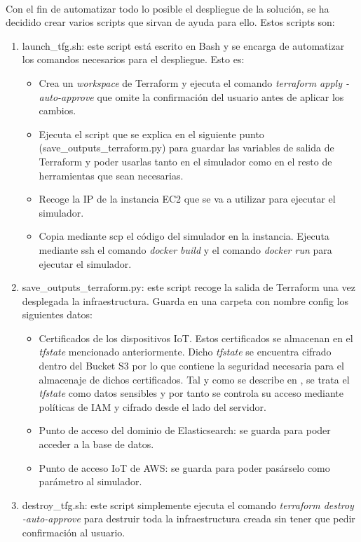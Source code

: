 \documentclass[../../memoria.tex]{subfiles}
\begin{document}
\paragraph{}
Con el fin de automatizar todo lo posible el despliegue de la solución, se ha decidido crear varios scripts que sirvan de ayuda para ello. Estos scripts son:

\begin{enumerate}
    \item launch\_tfg.sh: este script está escrito en Bash y se encarga de automatizar los comandos necesarios para el despliegue. Esto es:
          \begin{itemize}
              \item Crea un \textit{workspace} de Terraform y ejecuta el comando \textit{terraform apply -auto-approve} que omite la confirmación del usuario antes de aplicar los cambios.
              \item Ejecuta el script que se explica en el siguiente punto (save\_outputs\_terraform.py) para guardar las variables de salida de Terraform y poder usarlas tanto en el simulador como en el resto de herramientas que sean necesarias.
              \item Recoge la IP de la instancia EC2 que se va a utilizar para ejecutar el simulador.
              \item Copia mediante scp el código del simulador en la instancia. Ejecuta mediante ssh el comando \textit{docker build} y el comando \textit{docker run} para ejecutar el simulador.
          \end{itemize}

    \item save\_outputs\_terraform.py: este script recoge la salida de Terraform una vez desplegada la infraestructura. Guarda en una carpeta con nombre config los siguientes datos:
          \begin{itemize}
              \item Certificados de los dispositivos IoT. Estos certificados se almacenan en el \textit{tfstate} mencionado anteriormente. Dicho \textit{tfstate} se encuentra cifrado dentro del Bucket S3 por lo que contiene la seguridad necesaria para el almacenaje de dichos certificados. Tal y como se describe en \cite{terraformsensitive}, se trata el \textit{tfstate} como datos sensibles y por tanto se controla su acceso mediante políticas de IAM y cifrado desde el lado del servidor.

              \item Punto de acceso del dominio de Elasticsearch: se guarda para poder acceder a la base de datos.

              \item Punto de acceso IoT de AWS: se guarda para poder pasárselo como parámetro al simulador.
          \end{itemize}

    \item destroy\_tfg.sh: este script simplemente ejecuta el comando \textit{terraform destroy -auto-approve} para destruir toda la infraestructura creada sin tener que pedir confirmación al usuario.
\end{enumerate}
\end{document}
